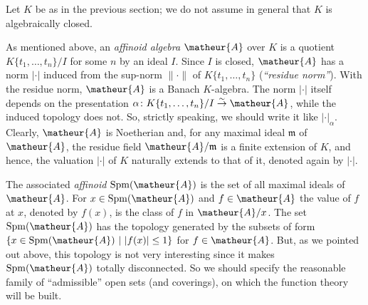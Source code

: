 Let $K$ be as in the previous section; we do not assume in general 
that $K$ is algebraically closed.

As mentioned above, an {\it affinoid algebra}
$\matheur{A}$ over $K$ is a quotient $K\{t_1,\ldots,t_n\}/I$ for some
$n$ by an ideal $I$.  Since $I$ is closed, $\matheur{A}$ has a norm
$|\cdot |$ induced from the sup-norm $\|\cdot \|$ of
$K\{t_1,\ldots,t_n\}$ ({\it ``residue norm''}).  With the residue norm,
$\matheur{A}$ is a Banach $K$-algebra.  The norm $|\cdot |$ itself
depends on the presentation $\alpha\colon
K\{t_1,\ldots,t_n\}/I\stackrel{\sim}{\rightarrow}\matheur{A}$, while the
induced topology does not.  So, strictly speaking, we should write it
like $|\cdot |_{\alpha}$.  Clearly, $\matheur{A}$ is Noetherian and, for
any maximal ideal $\mathfrak{m}$ of $\matheur{A}$, the residue field
$\matheur{A}/\mathfrak{m}$ is a finite extension of $K$, and hence, the
valuation $|\cdot |$ of $K$ naturally extends to that of it, denoted
again by $|\cdot |$.

The associated {\it affinoid} $\mathrm{Spm}({\matheur{A}})$ is the set of all
maximal ideals of $\matheur{A}$.
For $x\in\mathrm{Spm}(\matheur{A})$ and $f\in\matheur{A}$ the value of $f$ at
$x$, denoted by $f(x)$, is the class of $f$ in $\matheur{A}/x$.
The set $\mathrm{Spm}({\matheur{A}})$ has the topology generated
by the subsets of form $\{x\in\mathrm{Spm}({\matheur{A}})\ |\ |f(x)|
\leq 1\}$ for $f\in\matheur{A}$.
But, as we pointed out above, this topology is not very interesting since 
it makes $\mathrm{Spm}({\matheur{A}})$ totally disconnected.
So we should specify the reasonable family of ``admissible'' open
sets (and coverings), on which the function theory will be built.

